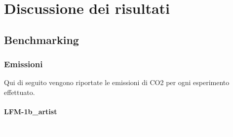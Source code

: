 \section{Discussione dei risultati}

\subsection{Benchmarking}

\subsubsection{Emissioni}
Qui di seguito vengono riportate le emissioni di CO2 per ogni esperimento effettuato.

\paragraph{LFM-1b\_artist} \textcolor{white}{.} \\
